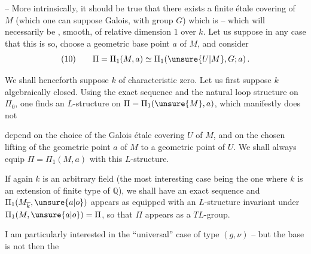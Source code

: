 
 -- More intrinsically, it should be true that there exists a finite étale covering of $M$ (which one can suppose Galois, with group $G$)  which is   -- which will necessarily be , smooth, of relative dimension $1$ over $k$. Let us suppose in any case that this is so, choose a geometric base point $a$ of $M$, and consider
\[
(10)\qquad \Pi=\Pi_1(M,a)\simeq\Pi_1(\unsure{U|M},G;a)\,.
\]

We shall henceforth suppose $k$ of characteristic zero. Let us first suppose $k$ algebraically closed. Using the exact sequence
and the natural  loop structure on $\Pi_0$, one finds an $L$-structure on $\Pi=\Pi_1(\unsure{M},a)$, which manifestly does not


depend on the choice of the  Galois étale covering $U$ of $M$, and on the chosen lifting of the geometric point $a$ of $M$ to a geometric point of $U$. We shall always  equip $\Pi=\Pi_1(M,a)$ with this $L$-structure.

If again $k$ is an arbitrary field (the most interesting case being the one where $k$ is an extension of finite type of $\mathbb{Q}$), we shall have an exact sequence
and $\Pi_1(M_{\overline{k}},\unsure{a|o})$ appears as equipped with an $L$-structure invariant under $\Pi_1(M,\unsure{a|o})=\Pi$, so that $\Pi$ appears as a $TL$-group.

I am particularly interested in the ``universal'' case of type $(g,\nu)$ -- but the  base is not then the


